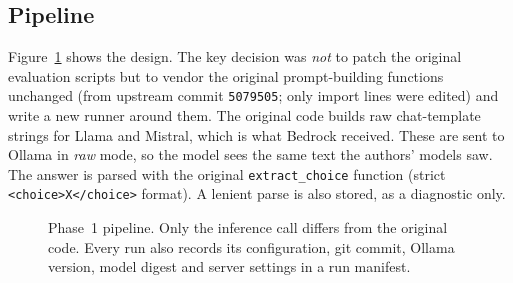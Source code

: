 \documentclass[11pt,a4paper]{article}
\begin{document}
\subsection{Pipeline}
Figure~\ref{fig:pipeline} shows the design. The key decision was \emph{not} to patch the original evaluation scripts but to
vendor the original prompt-building functions unchanged (from upstream commit \texttt{5079505}; only import lines were
edited) and write a new runner around them. The original code builds raw chat-template strings for Llama and Mistral,
which is what Bedrock received. These are sent to Ollama in \emph{raw} mode, so the model sees the same text the authors' models saw.
The answer is parsed with the original \texttt{extract\_choice} function (strict \texttt{<choice>X</choice>} format).
A lenient parse is also stored, as a diagnostic only.

\begin{figure}[H]
\centering
{}
\caption{Phase~1 pipeline. Only the inference call differs from the original code. Every run also records its configuration, git
commit, Ollama version, model digest and server settings in a run manifest.}
\label{fig:pipeline}
\end{figure}
\end{document}
